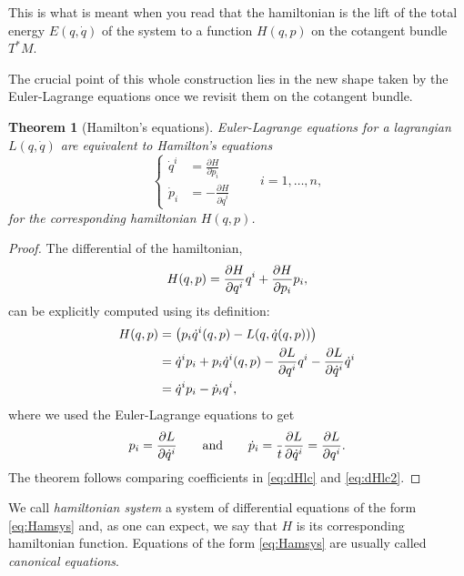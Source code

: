 \documentclass[english,fontsize=11pt,paper=a5,oneside]{scrbook}
\let\d\relax
\DeclareMathOperator{\d}{d}
\newtheorem{theorem}{Theorem}[chapter]
\theoremstyle{definition}
\newenvironment{remark}
  {\pushQED{\qed}\renewcommand{\qedsymbol}{$\lozenge$}\remarkx}
  {\popQED\endremarkx}
\begin{document}
\begin{remark}
This is what is meant when you read that the hamiltonian is the lift of the total energy $E(q, \dot q)$ of the system to a function $H(q,p)$ on the cotangent bundle $T^*M$.
\end{remark}

The crucial point of this whole construction lies in the new shape taken by the Euler-Lagrange equations once we revisit them on the cotangent bundle.

\begin{theorem}[Hamilton's equations]\label{thm:Hameqns}
    Euler-Lagrange equations for a lagrangian $L(q,\dot q)$ are equivalent to \emph{Hamilton's equations}
    \begin{equation}\label{eq:Hamsys}
        \left\lbrace
        \begin{aligned}
            \dot q^i &= \frac{\partial H}{\partial \dot p_i}\\
            \dot p_i &= -\frac{\partial H}{\partial \dot q^i}
        \end{aligned}
        \right. \qquad i=1,\ldots,n,
    \end{equation}
    for the corresponding hamiltonian $H(q,p)$.
\end{theorem}
\begin{proof}
    The differential of the hamiltonian,
    \begin{equation}\label{eq:dHlc}
        \d H(q,p) = \frac{\partial H}{\partial q^i}\d q^i + \frac{\partial H}{\partial p_i}\d p_i,
    \end{equation}
    can be explicitly computed using its definition:
    \begin{align}
        \d H(q,p) &= \d \left( p_i\dot q^i(q,p) - L(q, \dot q(q,p)) \right) \\
        &= \dot q^i \d p_i + p_i \d \dot q^i(q,p) - \frac{\partial L}{\partial q^i} \d q^i - \frac{\partial L}{\partial \dot q^i} \d \dot q^i \\
        &= \dot q^i \d p_i - \dot p_i \d q^i, \label{eq:dHlc2}
    \end{align}
    where we used the Euler-Lagrange equations to get
    \begin{equation}
        p_i = \frac{\partial L}{\partial \dot q^i}
        \qquad\mbox{and}\qquad
        \dot p_i = \frac{\d }{\d t}\frac{\partial L}{\partial \dot q^i} = \frac{\partial L}{\partial q^i}.
    \end{equation}
    The theorem follows comparing coefficients in \eqref{eq:dHlc} and \eqref{eq:dHlc2}.
\end{proof}
We call \emph{hamiltonian system} a system of differential equations of the form \eqref{eq:Hamsys} and, as one can expect, we say that $H$ is its corresponding hamiltonian function. Equations of the form \eqref{eq:Hamsys} are usually called \emph{canonical equations}.
\end{document}
